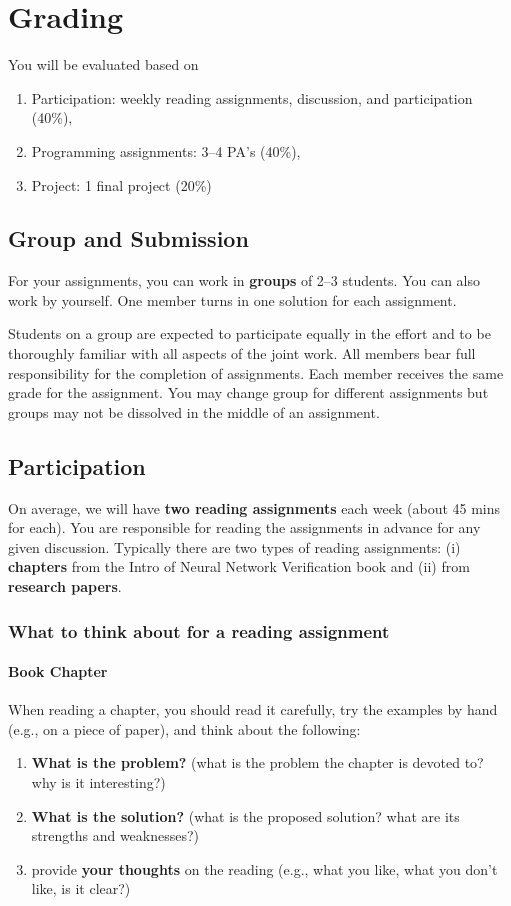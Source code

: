 \documentclass[11pt]{article}
\begin{document}
\section{Grading}
You will be evaluated based on
\begin{enumerate}
\item Participation:  weekly reading assignments, discussion, and participation (40\%),
\item Programming assignments: 3--4 PA's (40\%), 
\item Project: 1 final project  (20\%)
\end{enumerate}

\subsection*{Group and Submission} 
For your assignments, you can work in \textbf{groups} of 2--3 students.  You can also work by yourself. One member turns in one solution for each assignment. 

Students on a group are expected to participate equally in the effort
    and to be thoroughly familiar with all aspects of the joint work.
    All members bear full responsibility for the completion of
    assignments. 
    Each member receives the same grade for the assignment.  You may change group for different assignments but groups may not be dissolved in the middle of an assignment.
\subsection{Participation}
\label{sec:org16c195f}

On average, we will have \textbf{\textbf{two reading assignments}} each week (about 45 mins for each). 
You are responsible for reading the assignments in advance for any given discussion.  Typically there are two types of reading assignments:  (i) \textbf{chapters} from the Intro of Neural Network Verification book and (ii) from \textbf{research papers}.  

\subsubsection{What to think about for a reading assignment}\label{sec:reading}
\paragraph{Book Chapter} When reading a chapter, you should read it carefully, try the examples by hand (e.g., on a piece of paper), and think about the following:
\begin{enumerate}
    \item  \textbf{What is the problem?} (what is the problem the chapter is devoted to? why is it interesting?)
    \item \textbf{What is the solution?} (what is the proposed solution? what are its strengths and weaknesses?)
    \item  provide \textbf{your thoughts} on the reading (e.g., what you like, what you don't like, is it clear?)

\end{enumerate}    
\end{document}
